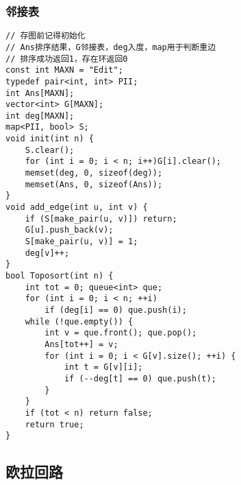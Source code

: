 \documentclass[a4]{article}
\begin{document}
\subsubsection{邻接表}
\begin{lstlisting}
// 存图前记得初始化
// Ans排序结果，G邻接表，deg入度，map用于判断重边
// 排序成功返回1，存在环返回0
const int MAXN = "Edit";
typedef pair<int, int> PII;
int Ans[MAXN];
vector<int> G[MAXN];
int deg[MAXN];
map<PII, bool> S;
void init(int n) {
	S.clear();
	for (int i = 0; i < n; i++)G[i].clear();
	memset(deg, 0, sizeof(deg));
	memset(Ans, 0, sizeof(Ans));
}
void add_edge(int u, int v) {
	if (S[make_pair(u, v)]) return;
	G[u].push_back(v);
	S[make_pair(u, v)] = 1;
	deg[v]++;
}
bool Toposort(int n) {
	int tot = 0; queue<int> que;
	for (int i = 0; i < n; ++i)
		if (deg[i] == 0) que.push(i);
	while (!que.empty()) {
		int v = que.front(); que.pop();
		Ans[tot++] = v;
		for (int i = 0; i < G[v].size(); ++i) {
			int t = G[v][i];
			if (--deg[t] == 0) que.push(t);
		}
	}
	if (tot < n) return false;
	return true;
}
\end{lstlisting}
\subsection{欧拉回路}
\end{document}
